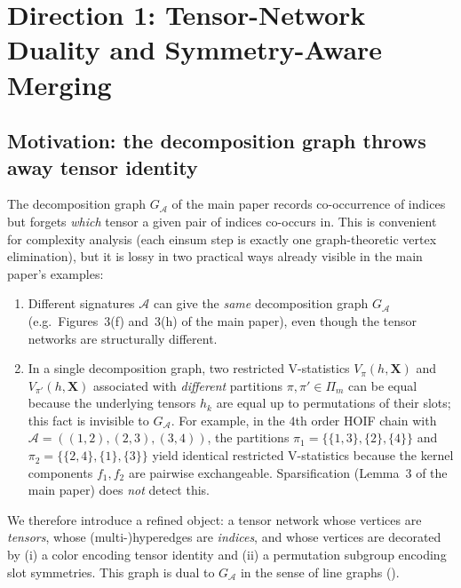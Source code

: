 \documentclass[11pt]{article}
\newcommand{\calA}{\mathcal{A}}
\newcommand{\bX}{\bm{X}}
\theoremstyle{plain}
\theoremstyle{definition}
\begin{document}
\section{Direction 1: Tensor-Network Duality and Symmetry-Aware Merging}
\label{sec:tn}

\subsection{Motivation: the decomposition graph throws away tensor identity}

The decomposition graph $G_\calA$ of the main paper records co-occurrence of
indices but forgets \emph{which} tensor a given pair of indices co-occurs in.
This is convenient for complexity analysis (each einsum step is exactly one
graph-theoretic vertex elimination), but it is lossy in two practical ways
already visible in the main paper's examples:

\begin{enumerate}[label=(\alph*),leftmargin=2em]
\item Different signatures $\calA$ can give the \emph{same} decomposition
graph $G_\calA$ (e.g.\ Figures~3(f) and~3(h) of the main paper), even though
the tensor networks are structurally different.

\item In a single decomposition graph, two restricted V-statistics
$V_\pi(h,\bX)$ and $V_{\pi'}(h,\bX)$ associated with \emph{different}
partitions $\pi,\pi'\in\Pi_m$ can be equal because the underlying tensors
$h_k$ are equal up to permutations of their slots; this fact is invisible
to $G_\calA$.  For example, in the $4$th order HOIF chain with
$\calA=((1,2),(2,3),(3,4))$, the partitions $\pi_1=\{\{1,3\},\{2\},\{4\}\}$
and $\pi_2=\{\{2,4\},\{1\},\{3\}\}$ yield identical restricted
V-statistics because the kernel components $f_1, f_2$ are pairwise
exchangeable.  Sparsification (Lemma~3 of the main paper) does \emph{not}
detect this.
\end{enumerate}

We therefore introduce a refined object: a tensor network whose vertices are
\emph{tensors}, whose (multi-)hyperedges are \emph{indices}, and whose
vertices are decorated by (i) a color encoding tensor identity and (ii) a
permutation subgroup encoding slot symmetries.  This graph is dual to
$G_\calA$ in the sense of line graphs ().
\end{document}
